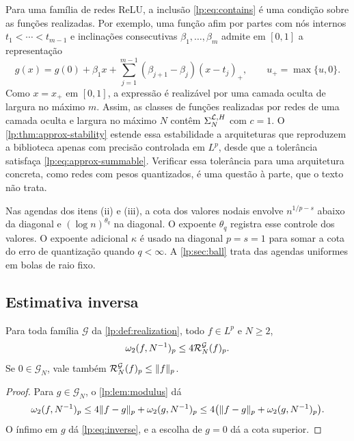 \documentclass[12pt,a4paper]{article}
\begin{document}
Para uma família de redes ReLU, a inclusão \eqref{lp:eq:contains} é uma condição sobre as funções realizadas. Por exemplo, uma função afim por partes com nós internos $t_1<\cdots<t_{m-1}$ e inclinações consecutivas $\beta_1,\ldots,\beta_m$ admite em $[0,1]$ a representação
\[
 g(x)=g(0)+\beta_1 x+\sum_{j=1}^{m-1}(\beta_{j+1}-\beta_j)(x-t_j)_+,
 \qquad u_+=\max\{u,0\}.
\]
Como $x=x_+$ em $[0,1]$, a expressão é realizável por uma camada oculta de largura no máximo $m$. Assim, as classes de funções realizadas por redes de uma camada oculta e largura no máximo $N$ contêm $\Sigma_{N}^{\mathcal L,H}$ com $c=1$. O \cref{lp:thm:approx-stability} estende essa estabilidade a arquiteturas que reproduzem a biblioteca apenas com precisão controlada em $L^p$, desde que a tolerância satisfaça \eqref{lp:eq:approx-summable}. Verificar essa tolerância para uma arquitetura concreta, como redes com pesos quantizados, é uma questão à parte, que o texto não trata.

Nas agendas dos itens (ii) e (iii), a cota dos valores nodais envolve $n^{1/p-s}$ abaixo da diagonal e $(\log n)^{\theta_q}$ na diagonal. O expoente $\theta_q$ registra esse controle dos valores. O expoente adicional $\kappa$ é usado na diagonal $p=s=1$ para somar a cota do erro de quantização quando $q<\infty$. A \cref{lp:sec:ball} trata das agendas uniformes em bolas de raio fixo.

\subsection{Estimativa inversa}

\label{lp:sec:proved}

\begin{proposicao}
\label{lp:prop:inverse}
Para toda família $\mathcal G$ da \cref{lp:def:realization}, todo $f\in L^p$ e $N\ge2$,
\begin{equation}
 \omega_2(f,N^{-1})_{p}\le4\mathcal R^{\mathcal G}_{N}(f)_p.
 \label{lp:eq:inverse}
\end{equation}
Se $0\in\mathcal G_N$, vale também $\mathcal R^{\mathcal G}_{N}(f)_p\le\|f\|_p$.
\end{proposicao}

\begin{proof}
Para $g\in\mathcal G_N$, o \cref{lp:lem:modulus} dá
\[
 \omega_2(f,N^{-1})_{p}
 \le4\|f-g\|_p+\omega_2(g,N^{-1})_{p}
 \le4\bigl(\|f-g\|_p+\omega_2(g,N^{-1})_{p}\bigr).
\]
O ínfimo em $g$ dá \eqref{lp:eq:inverse}, e a escolha de $g=0$ dá a cota superior.
\end{proof}
\end{document}
